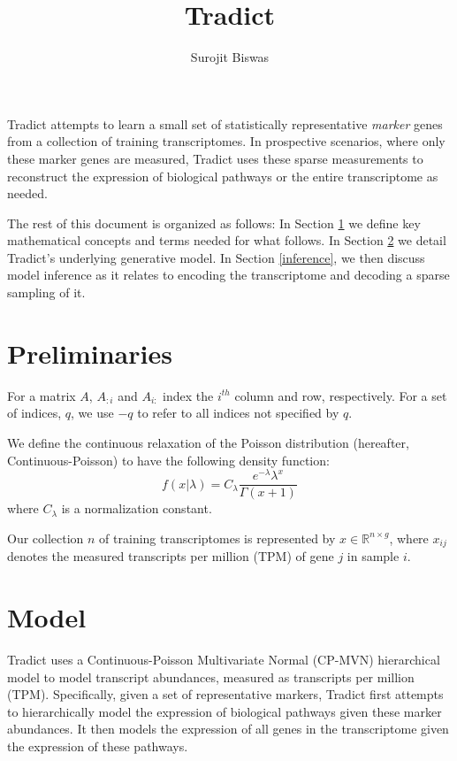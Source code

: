 \documentclass[10pt]{article}
\author{Surojit Biswas}
\date{}
\title{Tradict}
\begin{document}
\maketitle

\tableofcontents
\vspace{10mm}


Tradict attempts to learn a small set of statistically representative \emph{marker} genes from a collection of training transcriptomes. In prospective scenarios, where only these marker genes are measured, Tradict uses these sparse measurements to reconstruct the expression of biological pathways or the entire transcriptome as needed.

The rest of this document is organized as follows: In Section \ref{prelim} we define key mathematical concepts and terms needed for what follows. In Section \ref{model} we detail Tradict's underlying generative model. In Section \ref{inference}, we then discuss model inference as it relates to encoding the transcriptome and decoding a sparse sampling of it.

\section{Preliminaries} \label{prelim}

For a matrix $A$, $A_{:i}$ and $A_{i:}$ index the $i^{th}$ column and row, respectively. For a set of indices, $q$, we use $-q$ to refer to all indices not specified by $q$. 

We define the continuous relaxation of the Poisson distribution (hereafter, Continuous-Poisson) to have the following density function:
\[
f(x|\lambda) = C_\lambda \frac{e^{-\lambda} \lambda^x}{\Gamma(x + 1)}
\]
where $C_\lambda$ is a normalization constant.

Our collection $n$ of training transcriptomes is represented by $x \in \mathbb{R}^{n \times g}$, where $x_{ij}$ denotes the measured transcripts per million (TPM) of gene $j$ in sample $i$. 



\section{Model} \label{model}

Tradict uses a Continuous-Poisson Multivariate Normal (CP-MVN) hierarchical model to model transcript abundances, measured as transcripts per million (TPM). Specifically, given a set of representative markers, Tradict first attempts to hierarchically model the expression of biological pathways given these marker abundances. It then models the expression of all genes in the transcriptome given the expression of these pathways.
\end{document}
